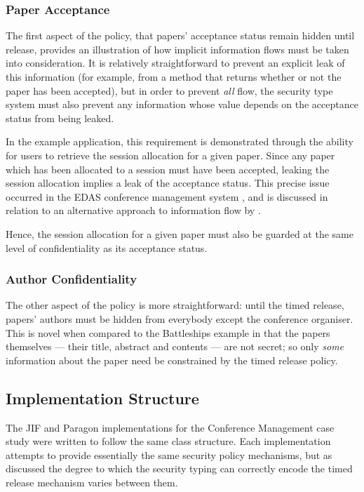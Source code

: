 \subsubsection{Paper Acceptance}

The first aspect of the policy, that papers' acceptance status remain hidden until release, provides an illustration of how implicit information flows must be taken into consideration. It is relatively straightforward to prevent an explicit leak of this information (for example, from a method that returns whether or not the paper has been accepted), but in order to prevent \textit{all} flow, the security type system must also prevent any information whose value depends on the acceptance status from being leaked.

In the example application, this requirement is demonstrated through the ability for users to retrieve the session allocation for a given paper. Since any paper which has been allocated to a session must have been accepted, leaking the session allocation implies a leak of the acceptance status. This precise issue occurred in the EDAS conference management system \cite{agrawal2016edas_conf}, and is discussed in relation to an alternative approach to information flow by \citeauthor{polikarpova2016lifty} \cite{polikarpova2016lifty}.

Hence, the session allocation for a given paper must also be guarded at the same level of confidentiality as its acceptance status.

\subsubsection{Author Confidentiality}

The other aspect of the policy is more straightforward: until the timed release, papers' authors must be hidden from everybody except the conference organiser. This is novel when compared to the Battleships example in that the papers themselves --- their title, abstract and contents --- are not secret; so only \textit{some} information about the paper need be constrained by the timed release policy.

\newpage

\subsection{Implementation Structure}

The JIF and Paragon implementations for the Conference Management case study were written to follow the same class structure. Each implementation attempts to provide essentially the same security policy mechanisms, but as discussed the degree to which the security typing can correctly encode the timed release mechanism varies between them.

